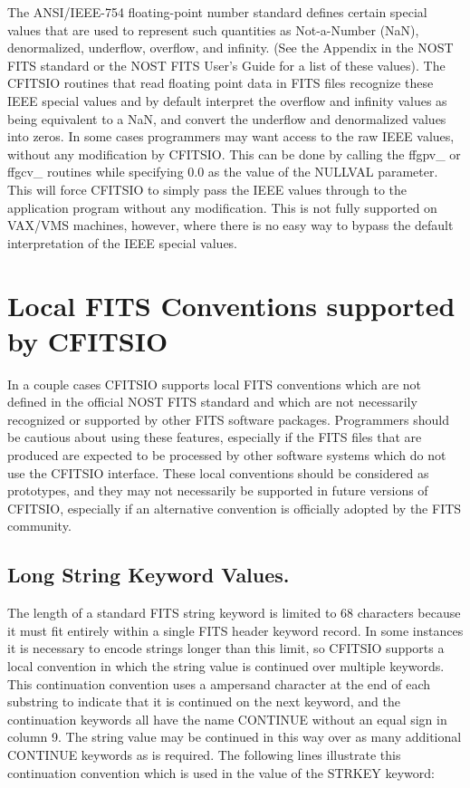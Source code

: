 The ANSI/IEEE-754 floating-point number standard defines certain
special values that are used to represent such quantities as
Not-a-Number (NaN), denormalized, underflow, overflow, and infinity.
(See the Appendix in the NOST FITS standard or the NOST FITS User's
Guide for a list of these values).  The CFITSIO routines that read
floating point data in FITS files recognize these IEEE special values
and by default interpret the overflow and infinity values as being
equivalent to a NaN, and convert the underflow and denormalized values
into zeros.  In some cases programmers may want access to the raw IEEE
values, without any modification by CFITSIO.  This can be done by
calling the ffgpv\_ or ffgcv\_ routines while specifying 0.0 as the
value of the NULLVAL parameter.  This will force CFITSIO to simply pass
the IEEE values through to the application program without any
modification.  This is not fully supported on VAX/VMS machines,
however, where there is no easy way to bypass the default
interpretation of the IEEE special values.


\section{Local FITS Conventions supported by CFITSIO}

In a couple cases CFITSIO supports local FITS conventions which are not
defined in the official NOST FITS standard and which are not
necessarily recognized or supported by other FITS software packages.
Programmers should be cautious about using these features, especially
if the FITS files that are produced are expected to be processed by
other software systems which do not use the CFITSIO interface.  These
local conventions should be considered as prototypes, and they may not
necessarily be supported in future versions of CFITSIO, especially if
an alternative convention is officially adopted by the FITS community.


\subsection{Long String Keyword Values.}

The length of a standard FITS string keyword is limited to 68
characters because it must fit entirely within a single FITS header
keyword record.  In some instances it is necessary to encode strings
longer than this limit, so CFITSIO supports a local convention in which
the string value is continued over multiple keywords.  This
continuation convention uses a ampersand character at the end of each
substring to indicate that it is continued on the next keyword, and the
continuation keywords all have the name CONTINUE without an equal sign
in column 9. The string value may be continued in this way over as many
additional CONTINUE keywords as is required.  The following lines
illustrate this continuation convention which is used in the value of
the STRKEY keyword:

